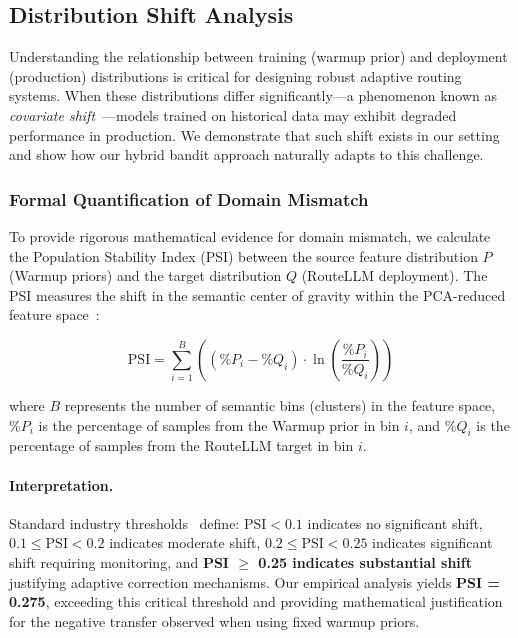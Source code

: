
\subsection{Distribution Shift Analysis}
\label{sec:distribution_shift}

Understanding the relationship between training (warmup prior) and deployment (production) distributions is critical for designing robust adaptive routing systems. When these distributions differ significantly---a phenomenon known as \emph{covariate shift}~\cite{shimodaira2000improving}---models trained on historical data may exhibit degraded performance in production. We demonstrate that such shift exists in our setting and show how our hybrid bandit approach naturally adapts to this challenge.

\subsubsection{Formal Quantification of Domain Mismatch}

To provide rigorous mathematical evidence for domain mismatch, we calculate the Population Stability Index (PSI) between the source feature distribution $P$ (Warmup priors) and the target distribution $Q$ (RouteLLM deployment). The PSI measures the shift in the semantic center of gravity within the PCA-reduced feature space~\cite{yurdakul2018statistical}:

\begin{equation}
\text{PSI} = \sum_{i=1}^{B} \left( (\%P_i - \%Q_i) \cdot \ln\left(\frac{\%P_i}{\%Q_i}\right) \right)
\label{eq:psi}
\end{equation}

\noindent where $B$ represents the number of semantic bins (clusters) in the feature space, $\%P_i$ is the percentage of samples from the Warmup prior in bin $i$, and $\%Q_i$ is the percentage of samples from the RouteLLM target in bin $i$.

\paragraph{Interpretation.} Standard industry thresholds~\cite{yurdakul2018statistical} define: $\text{PSI} < 0.1$ indicates no significant shift, $0.1 \leq \text{PSI} < 0.2$ indicates moderate shift, $0.2 \leq \text{PSI} < 0.25$ indicates significant shift requiring monitoring, and \textbf{PSI $\geq$ 0.25 indicates substantial shift} justifying adaptive correction mechanisms. Our empirical analysis yields \textbf{PSI = 0.275}, exceeding this critical threshold and providing mathematical justification for the negative transfer observed when using fixed warmup priors.

